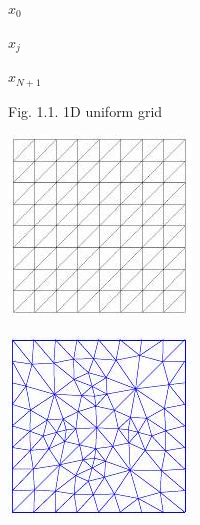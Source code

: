 \documentclass[10pt]{article}
\begin{document}
$x_{0}$

$x_{j}$

$x_{N+1}$

Fig. 1.1. 1D uniform grid

\includegraphics[max width=\textwidth]{2022_01_05_15c63bf4a948497c30d9g-05}

\includegraphics[max width=\textwidth]{2022_01_05_15c63bf4a948497c30d9g-05(1)}
\end{document}
